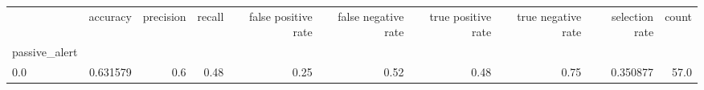 \begin{tabular}{lrrrrrrrrr}
\toprule
{} &  accuracy &  precision &  recall &  false positive rate &  false negative rate &  true positive rate &  true negative rate &  selection rate &  count \\
passive\_alert &           &            &         &                      &                      &                     &                     &                 &        \\
\midrule
0.0           &  0.631579 &        0.6 &    0.48 &                 0.25 &                 0.52 &                0.48 &                0.75 &        0.350877 &   57.0 \\
\bottomrule
\end{tabular}
